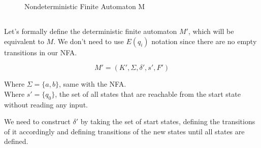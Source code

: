 \documentclass[12pt]{article}
\begin{document}
\begin{figure}[ht]
    \centering
    \caption{Nondeterministic Finite Automaton M}
    \label{fig:nfa}
\end{figure}

\subsection{}

\begin{center}
Let's formally define the deterministic finite automaton $M'$, which will be equivalent to $M$.
We don't need to use $E(q_i)$ notation since there are no empty transitions in our NFA.
\end{center}
\begin{equation*}
M' = (K', \Sigma, \delta', s', F')
\end{equation*}
\begin{center}
Where $\Sigma = \{a, b\}$, same with the NFA. \\
Where $s' = \{q_0\}$, the set of all states that are reachable from the start state without reading any input. \\
\end{center}

\newpage

\begin{center}
We need to construct $\delta'$ by taking the set of start states, defining the transitions of it accordingly and defining transitions of the new states until all states are defined.
\end{center}
\end{document}
